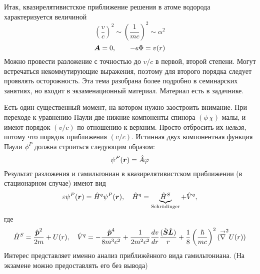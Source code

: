 
Итак, квазирелятивистское приближение решения в атоме водорода характеризуется величиной
$$
    \left(\dfrac{v}{c}\right)^2 \sim \left(
        \dfrac{1}{mc}
    \right)^2 \sim \alpha^2
$$
$$
    \bf A = 0,\qquad -e \Phi = v(r)
$$
Можно провести разложение с точностью до $v/c$ в первой, второй степени. Могут встречаться некоммутирующие выражения, поэтому для второго порядка следует проявлять осторожность. Эта тема разобрана более подробно в семинарских занятиях, но входит в экзаменационный материал. Материал есть в задачнике.

Есть один существенный момент, на котором нужно заостроить внимание. При переходе к уравнению Паули две нижние компоненты спинора $(\phi \, \chi)$  малы, и имеют порядок $(v/c)$ по отношению к верхним. Просто отбросить их \emph{нельзя}, потому что порядок приближения $(v/c)$. Истинная двух компонентная функция Паули $\phi^{P}$  должна строиться следующим образом:
$$
     \psi^{P} (\bf r) = \hat A \phi
$$ 
Результат разложения и гамильтониан в квазирелятивистском приближении (в стационарном случае) имеют вид
$$
    \eps \psi^{P}(\bf r) = \hat H^{q} \psi^P(\bf r), \quad \hat H^{q} = \underbrace{\hat H^{S}}_{\text{Schr\"odinger}} + \hat V^{q},
$$
где
$$
    \hat H^{S} = \dfrac{\hat{\bf p}^2}{2m} + U(r), \quad \hat V^{q}
     = - \dfrac{\hat{\bf p}^4}{8 m^3 c^2} + \dfrac{1}{2 m^2 c^2} \dfrac{dv}{dr} \dfrac{(\hat{\bf S} \hat{\bf L})}{r} + \dfrac{1}{8}\left(
        \dfrac{\hbar}{mc}
     \right)^2 (\vec \nabla^2 U(r))
$$
Интерес представляет именно анализ приближённого вида гамильтониана. (На экзамене можно предоставлять его без вывода)


